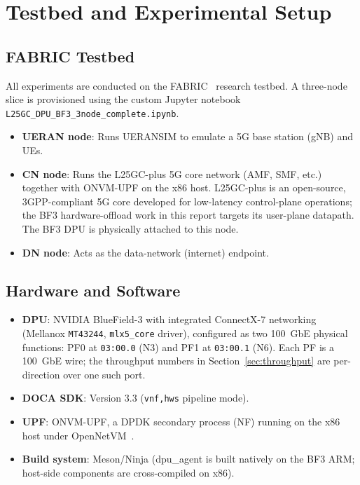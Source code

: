 \documentclass[conference]{IEEEtran}
\newcommand{\code}[1]{\nolinkurl{#1}}
\begin{document}
\section{Testbed and Experimental Setup}
\label{sec:testbed}

\subsection{FABRIC Testbed}

All experiments are conducted on the FABRIC~\cite{fabric} research testbed.
A three-node slice is provisioned using the custom Jupyter notebook
\code{L25GC_DPU_BF3_3node_complete.ipynb}.

\begin{itemize}
  \item \textbf{UERAN node}: Runs UERANSIM to emulate a 5G base station (gNB)
        and UEs.
  \item \textbf{CN node}: Runs the L25GC-plus 5G core network
        (AMF, SMF, etc.)~\cite{l25gcplus,l25gc,l25gc_rethink} together
        with ONVM-UPF on the x86 host.  L25GC-plus is an open-source,
        3GPP-compliant 5G core developed for low-latency control-plane
        operations; the BF3 hardware-offload work in this report
        targets its user-plane datapath.  The BF3 DPU is physically
        attached to this node.
  \item \textbf{DN node}: Acts as the data-network (internet) endpoint.
\end{itemize}

\subsection{Hardware and Software}

\begin{itemize}
  \item \textbf{DPU}: NVIDIA BlueField-3 with integrated
        ConnectX-7 networking (Mellanox \texttt{MT43244},
        \texttt{mlx5\_core} driver), configured as two 100~GbE
        physical functions: PF0 at \texttt{03:00.0} (N3) and PF1 at
        \texttt{03:00.1} (N6).  Each PF is a 100~GbE wire; the
        throughput numbers in Section~\ref{sec:throughput} are
        per-direction over one such port.
  \item \textbf{DOCA SDK}: Version 3.3 (\texttt{vnf,hws} pipeline mode).
  \item \textbf{UPF}: ONVM-UPF, a DPDK secondary process (NF) running on
        the x86 host under OpenNetVM~\cite{onvm}.
  \item \textbf{Build system}: Meson/Ninja (dpu\_agent is built natively on
        the BF3 ARM; host-side components are cross-compiled on x86).
\end{itemize}
\end{document}
